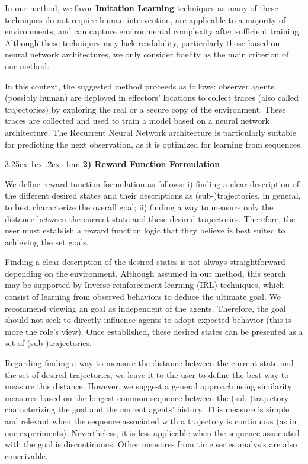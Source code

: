 \documentclass[conference]{IEEEtran}
\makeatletter
\renewcommand\paragraph{\@startsection{paragraph}{5}{\z@}%
  {3.25ex \@plus1ex \@minus.2ex}%
  {-1em}%
  {\normalfont\normalsize\bfseries}}
\makeatother
\begin{document}
In our method, we favor \textbf{Imitation Learning} techniques as many of these techniques do not require human intervention, are applicable to a majority of environments, and can capture environmental complexity after sufficient training. Although these techniques may lack readability, particularly those based on neural network architectures, we only consider fidelity as the main criterion of our method.

In this context, the suggested method proceeds as follows: observer agents (possibly human) are deployed in effectors' locations to collect traces (also called trajectories) by exploring the real or a secure copy of the environment. These traces are collected and used to train a model based on a neural network architecture. The Recurrent Neural Network architecture is particularly suitable for predicting the next observation, as it is optimized for learning from sequences.

\paragraph{\textbf{2) Reward Function Formulation}} \quad

\noindent We define reward function formulation as follows: \quad i) finding a clear description of the different desired states and their descriptions as (sub-)trajectories, in general, to best characterize the overall goal; \quad ii) finding a way to measure only the distance between the current state and these desired trajectories. Therefore, the user must establish a reward function logic that they believe is best suited to achieving the set goals.

Finding a clear description of the desired states is not always straightforward depending on the environment. Although assumed in our method, this search may be supported by Inverse reinforcement learning (IRL) techniques, which consist of learning from observed behaviors to deduce the ultimate goal. We recommend viewing an goal as independent of the agents. Therefore, the goal should not seek to directly influence agents to adopt expected behavior (this is more the role's view). Once established, these desired states can be presented as a set of (sub-)trajectories.

Regarding finding a way to measure the distance between the current state and the set of desired trajectories, we leave it to the user to define the best way to measure this distance. However, we suggest a general approach using similarity measures based on the longest common sequence between the (sub-)trajectory characterizing the goal and the current agents' history. This measure is simple and relevant when the sequence associated with a trajectory is continuous (as in our experiments). Nevertheless, it is less applicable when the sequence associated with the goal is discontinuous. Other measures from time series analysis are also conceivable.
\end{document}
